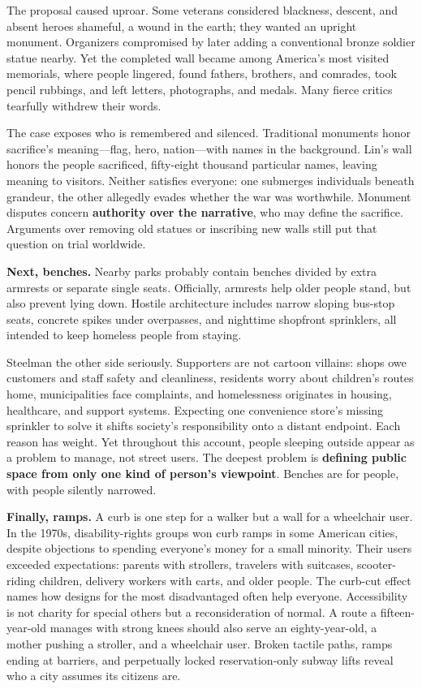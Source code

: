 The proposal caused uproar. Some veterans considered blackness, descent, and absent heroes shameful, a wound in the earth; they wanted an upright monument. Organizers compromised by later adding a conventional bronze soldier statue nearby. Yet the completed wall became among America's most visited memorials, where people lingered, found fathers, brothers, and comrades, took pencil rubbings, and left letters, photographs, and medals. Many fierce critics tearfully withdrew their words.

The case exposes who is remembered and silenced. Traditional monuments honor sacrifice's meaning---flag, hero, nation---with names in the background. Lin's wall honors the people sacrificed, fifty-eight thousand particular names, leaving meaning to visitors. Neither satisfies everyone: one submerges individuals beneath grandeur, the other allegedly evades whether the war was worthwhile. Monument disputes concern \textbf{authority over the narrative}, who may define the sacrifice. Arguments over removing old statues or inscribing new walls still put that question on trial worldwide.

\textbf{Next, benches.} Nearby parks probably contain benches divided by extra armrests or separate single seats. Officially, armrests help older people stand, but also prevent lying down. Hostile architecture includes narrow sloping bus-stop seats, concrete spikes under overpasses, and nighttime shopfront sprinklers, all intended to keep homeless people from staying.

Steelman the other side seriously. Supporters are not cartoon villains: shops owe customers and staff safety and cleanliness, residents worry about children's routes home, municipalities face complaints, and homelessness originates in housing, healthcare, and support systems. Expecting one convenience store's missing sprinkler to solve it shifts society's responsibility onto a distant endpoint. Each reason has weight. Yet throughout this account, people sleeping outside appear as a problem to manage, not street users. The deepest problem is \textbf{defining public space from only one kind of person's viewpoint}. Benches are for people, with people silently narrowed.

\textbf{Finally, ramps.} A curb is one step for a walker but a wall for a wheelchair user. In the 1970s, disability-rights groups won curb ramps in some American cities, despite objections to spending everyone's money for a small minority. Their users exceeded expectations: parents with strollers, travelers with suitcases, scooter-riding children, delivery workers with carts, and older people. The curb-cut effect names how designs for the most disadvantaged often help everyone. Accessibility is not charity for special others but a reconsideration of normal. A route a fifteen-year-old manages with strong knees should also serve an eighty-year-old, a mother pushing a stroller, and a wheelchair user. Broken tactile paths, ramps ending at barriers, and perpetually locked reservation-only subway lifts reveal who a city assumes its citizens are.

